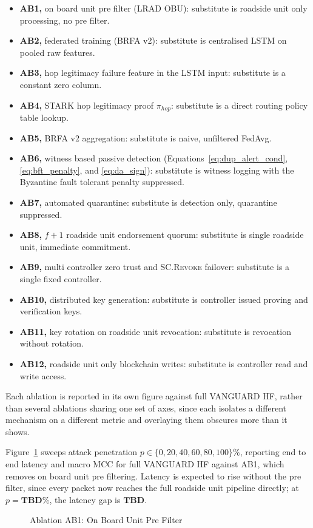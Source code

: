 \documentclass[final,5p,twocolumn]{elsarticle}
\theoremstyle{remark}
\theoremstyle{plain}
\newcommand{\TBD}{\textbf{TBD}} %
\begin{document}
\begin{itemize}
	\item \textbf{AB1,} on board unit pre filter (LRAD OBU): substitute is roadside unit only processing, no pre filter.
	\item \textbf{AB2,} federated training (BRFA v2): substitute is centralised LSTM on pooled raw features.
	\item \textbf{AB3,} hop legitimacy failure feature in the LSTM input: substitute is a constant zero column.
	\item \textbf{AB4,} STARK hop legitimacy proof $\pi_{hop}$: substitute is a direct routing policy table lookup.
	\item \textbf{AB5,} BRFA v2 aggregation: substitute is naive, unfiltered FedAvg.
	\item \textbf{AB6,} witness based passive detection (Equations~\eqref{eq:dup_alert_cond}, \eqref{eq:bft_penalty}, and \eqref{eq:da_sign}): substitute is witness logging with the Byzantine fault tolerant penalty suppressed.
	\item \textbf{AB7,} automated quarantine: substitute is detection only, quarantine suppressed.
	\item \textbf{AB8,} $f{+}1$ roadside unit endorsement quorum: substitute is single roadside unit, immediate commitment.
	\item \textbf{AB9,} multi controller zero trust and \textsc{SC.Revoke} failover: substitute is a single fixed controller.
	\item \textbf{AB10,} distributed key generation: substitute is controller issued proving and verification keys.
	\item \textbf{AB11,} key rotation on roadside unit revocation: substitute is revocation without rotation.
	\item \textbf{AB12,} roadside unit only blockchain writes: substitute is controller read and write access.
\end{itemize}

Each ablation is reported in its own figure against full VANGUARD HF,
rather than several ablations sharing one set of axes, since each
isolates a different mechanism on a different metric and overlaying them
obscures more than it shows.

Figure~\ref{fig:ab1} sweeps attack penetration $p \in \{0,20,40,60,80,100\}\%$,
reporting end to end latency and macro MCC for full VANGUARD HF against
AB1, which removes on board unit pre filtering. Latency is expected to
rise without the pre filter, since every packet now reaches the full
roadside unit pipeline directly; at $p{=}\TBD\%$, the latency gap is
$\TBD$.
\begin{figure}[!t]
	\centering
	\caption{Ablation AB1: On Board Unit Pre Filter}
	\label{fig:ab1}
\end{figure}
\end{document}
